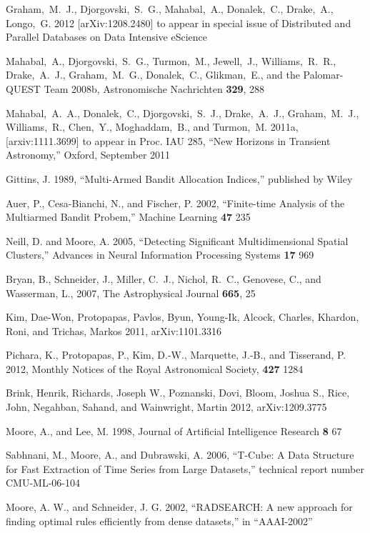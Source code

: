 \documentclass[prd,nofootbib,floatfix,11pt,tightenlines,nofootinbib]{revtex4}
\begin{document}
\begin{thebibliography}{99}
Graham,~M.~J., Djorgovski,~S.~G., Mahabal,~A., Donalek,~C., Drake,~A.,
Longo,~G. 2012 [arXiv:1208.2480] to appear in special issue of Distributed and
Parallel Databases on Data Intensive eScience

Mahabal,~A., Djorgovski,~S.~G., Turmon,~M., Jewell,~J., Williams,~R.~R.,
Drake,~A.~J., Graham,~M.~G., Donalek,~C., Glikman,~E., and the Palomar-QUEST Team
2008b, Astronomische Nachrichten {\bf 329}, 288


Mahabal,~A.~A., Donalek,~C., Djorgovski,~S.~J., Drake,~A.~J.,
Graham,~M.~J., Williams,~R., Chen,~Y., Moghaddam,~B., and Turmon,~M.
2011a, [arxiv:1111.3699] to appear in Proc. IAU 285, ``New Horizons in Transient
Astronomy,'' Oxford, September 2011

Gittins, J. 1989, ``Multi-Armed Bandit Allocation Indices,'' published by Wiley

Auer, P., Cesa-Bianchi, N., and Fischer, P. 2002,
``Finite-time Analysis of the Multiarmed Bandit Probem,''
Machine Learning {\bf 47} 235

Neill, D. and Moore, A. 2005,
``Detecting Significant Multidimensional Spatial Clusters,''
Advances in Neural Information Processing Systems {\bf 17} 969

Bryan, B., Schneider, J., Miller, C.~J., Nichol, R.~C., Genovese, C., and
Wasserman, L., 2007,
The Astrophysical Journal {\bf 665}, 25

Kim, Dae-Won, Protopapas, Pavlos, Byun, Young-Ik, Alcock, Charles, Khardon,
Roni, and Trichas, Markos 2011, arXiv:1101.3316

Pichara, K., Protopapas, P., Kim, D.-W., Marquette, J.-B., and Tisserand, P.
2012, Monthly Notices of the Royal Astronomical Society, {\bf 427} 1284

Brink, Henrik, Richards, Joseph W., Poznanski, Dovi, Bloom, Joshua S., Rice,
John, Negahban, Sahand, and Wainwright, Martin 2012, arXiv:1209.3775

Moore, A., and Lee, M. 1998, Journal of Artificial Intelligence Research {\bf 8} 67

Sabhnani, M., Moore, A., and Dubrawski, A. 2006,
``T-Cube: A Data Structure for Fast Extraction of Time Series from Large Datasets,''
technical report number CMU-ML-06-104

Moore, A. W., and Schneider, J. G. 2002, 
``RADSEARCH: A new approach for finding optimal rules
efficiently from dense datasets,'' in ``AAAI-2002''


\end{thebibliography}
\end{document}
